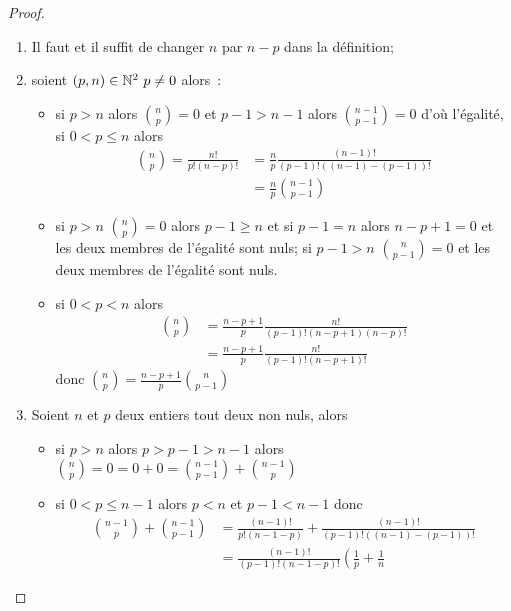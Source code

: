 \begin{proof}
  \begin{enumerate}
    \item Il faut et il suffit de changer \(n\) par \(n - p\) dans la
      définition;
    \item soient \((p, n)\in\mathbb{N}^2\ p\neq 0\) alors~:
      \begin{itemize}
        \item si \(p > n\) alors \(\binom{n}{p} = 0\) et \(p - 1 > n - 1\) alors
          \(\binom{n - 1}{p - 1} = 0\) d'où l'égalité, si \(0 < p \leqslant n\)
          alors
          \begin{align}
            \binom{n}{p} = \frac{n!}{p!(n - p)!}
          & = \frac{n}{p}\frac{(n - 1)!}{(p - 1)!((n - 1)-(p - 1))!}\\
          & = \frac{n}{p}\binom{n - 1}{p - 1}
          \end{align}
        \item si \(p > n\) \(\binom{n}{p} = 0\) alors \(p - 1\geqslant n\) et si
          \(p - 1 = n\) alors \(n - p + 1 = 0\) et les deux membres de l'égalité
          sont nuls; si \(p - 1 > n\)  \(\binom{n}{p - 1} = 0\) et les deux
          membres de l'égalité sont nuls.
        \item si \(0 < p < n\) alors
          \begin{align}
            \binom{n}{p}& = \frac{n - p + 1}{p}\frac{n!}{(p - 1)!(n - p + 1)(n -
            p)!}\\
                        & = \frac{n - p + 1}{p}\frac{n!}{(p - 1)!(n - p + 1)!}
            \end{align}
            donc \(\binom{n}{p} = \frac{n - p + 1}{p}\binom{n}{p - 1}\)
      \end{itemize}
    \item Soient \(n\) et \(p\) deux entiers tout deux non nuls, alors
      \begin{itemize}
        \item si \(p > n\) alors \(p > p - 1 > n - 1\) alors \(\binom{n}{p} =
          0 = 0 + 0 = \binom{n - 1}{p - 1} + \binom{n - 1}{p}\)
        \item si \(0 < p \leqslant n - 1\) alors \(p < n\) et \(p - 1 < n -
          1\) donc
          \begin{align}
            \binom{n - 1}{p}+\binom{n - 1}{p - 1}
            &= \frac{(n - 1)!}{p!(n - 1 - p)}+\frac{(n - 1)!}{(p - 1)!((n -
            1)-(p - 1))!}\\
            &= \frac{(n - 1)!}{(p - 1)!(n - 1 - p)!}\left(\frac{1}{p}+\frac{1}{n
}
\end{align}
\end{itemize}
\end{enumerate}
\end{proof}
